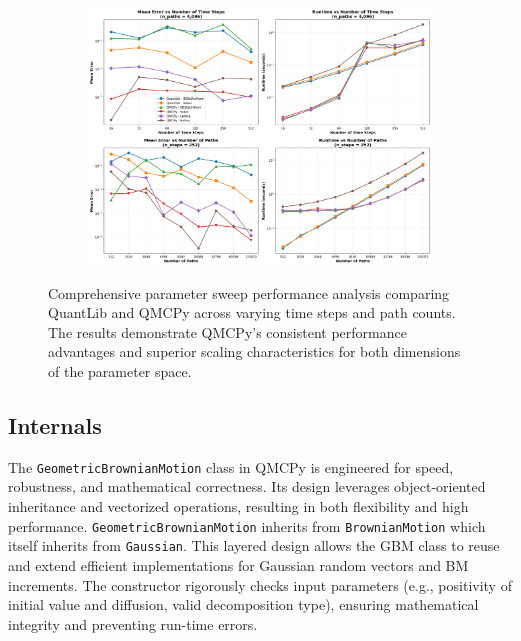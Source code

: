 \begin{figure}[H]
    \centering
    \begin{subfigure}{1\textwidth}
        \centering
        \includegraphics[width=\textwidth]{GBM/images/figure_7.png}
        \label{subfig:performance_steps2}
    \end{subfigure}

    \caption{Comprehensive parameter sweep performance analysis comparing QuantLib and QMCPy across varying time steps and path counts. The results demonstrate QMCPy's consistent performance advantages and superior scaling characteristics for both dimensions of the parameter space.}
    \label{fig:gbm_performance2}
\end{figure}

\subsection{Internals}

The \texttt{GeometricBrownianMotion} class in QMCPy is engineered for speed,
robustness, and mathematical correctness. Its design leverages object-oriented
inheritance and vectorized operations, resulting in both flexibility and high
performance. \texttt{GeometricBrownianMotion} inherits from
\texttt{BrownianMotion} which itself inherits from \texttt{Gaussian}. This
layered design allows the GBM class to reuse and extend efficient
implementations for Gaussian random vectors and BM increments. The constructor
rigorously checks input parameters (e.g., positivity of initial value and
diffusion, valid decomposition type), ensuring mathematical integrity and
preventing run-time errors.

